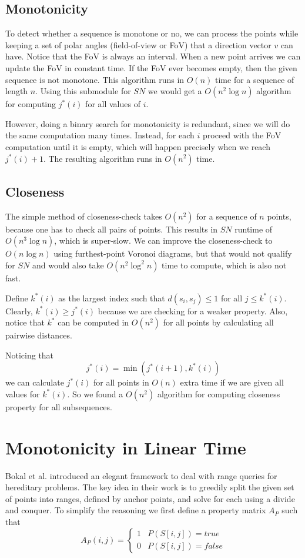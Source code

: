 \documentclass{article}
\newcommand{\twopartdef}[4]
{
    \left\{
    \begin{array}{ll}
        #1 & #2 \\
        #3 & #4
    \end{array}
    \right.
}
\begin{document}
\subsection{Monotonicity}
\label{sec:naive:monotonicity}
To detect whether a sequence is monotone or no, we can process the
points while keeping a set of polar angles (field-of-view or FoV)
that a direction vector $v$ can have. Notice that the FoV is always
an interval. When a new point arrives we can update the FoV in
constant time. If the FoV ever becomes empty, then the given sequence
is not monotone. This algorithm runs in $O(n)$ time for a sequence
of length $n$. Using this submodule for $SN$ we would get a $O(n^2\log
n)$ algorithm for computing $j^*(i)$ for all values of $i$.

However, doing a binary search for monotonicity is redundant, since
we will do the same computation many times. Instead, for each $i$
proceed with the FoV computation until it is empty, which will
happen precisely when we reach $j^*(i) + 1$. The resulting algorithm
runs in $O(n^2)$ time.

\subsection{Closeness}
\label{sec:naive:closeness}
The simple method of closeness-check takes $O(n^2)$ for a sequence
of $n$ points, because one has to check all pairs of points. This
results in $SN$ runtime of $O(n^3\log n)$, which is super-slow. We
can improve the closeness-check to $O(n\log n)$ using furthest-point
Voronoi diagrams, but that would not qualify for $SN$ and would
also take $O(n^2 \log^2 n)$ time to compute, which is also not fast.

Define $k^*(i)$ as the largest index such that $d(s_i, s_j) \leq
1$ for all $j \leq k^*(i)$. Clearly, $k^*(i) \geq j^*(i)$ because
we are checking for a weaker property. Also, notice that $k^*$ can
be computed in $O(n^2)$ for all points by calculating all pairwise
distances.

Noticing that 
\begin{equation}
\label{kj_rel}
j^*(i) = \min( j^*(i + 1), k^*(i) )
\end{equation}
we can calculate
$j^*(i)$ for all points in $O(n)$ extra time if we are given all
values for $k^*(i)$. So we found a $O(n^2)$ algorithm for computing
closeness property for all subsequences.

\section{Monotonicity in Linear Time}
\label{sec:monotonicity}
Bokal et al. introduced an elegant framework to deal with range
queries for hereditary problems. The key idea in their work is to
greedily split the given set of points into ranges, defined by
anchor points, and solve for each using a divide and conquer. To
simplify the reasoning we first define a property matrix $A_P$ such
that
\[ A_P(i, j) = \twopartdef{1}{P(S[i, j]) = true}{0}{P(S[i, j]) = false} \]
\end{document}

